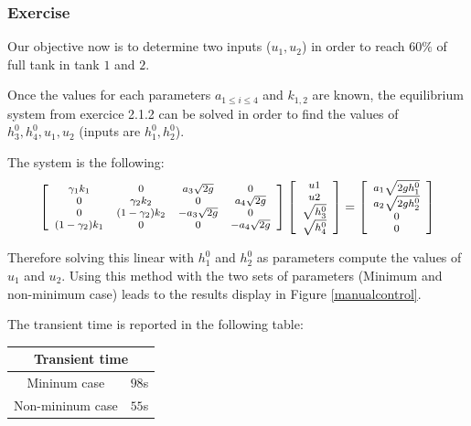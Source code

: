\subsubsection{Exercise}

Our objective now is to determine two inputs ($u_1, u_2$) in order to reach $60\%$ of full tank in tank $1$ and $2$.

Once the values for each parameters $a_{1 \leq i \leq 4}$ and $k_{1,2}$ are known, the equilibrium system from exercice 2.1.2 can be solved in order to find the values of $h_3^0,h_4^0,u_1,u_2$ (inputs are $h_1^0,h_2^0$).  

The system is the following:
$$
    \footnotesize
\left[
    \begin{array}{cccc}
        \gamma_1 k_1 & 0 & a_3 \sqrt{2g} & 0 \\
        0 & \gamma_2 k_2 & 0 & a_4 \sqrt{2g} \\
        0 & (1-\gamma_2) k_2 & -a_3 \sqrt{2g} & 0 \\
        (1-\gamma_2) k_1 & 0 & 0 & -a_4 \sqrt{2g} \\
    \end{array}
\right]
\left[
    \begin{array}{c}
        u1 \\ u2 \\ \sqrt{h_3^0} \\ \sqrt{h_4^0}
    \end{array}
\right]
=
\left[
    \begin{array}{c}
        a_1 \sqrt{2gh_1^0} \\
        a_2 \sqrt{2gh_2^0} \\
        0 \\
        0 \\
    \end{array}
\right]
$$

Therefore solving this linear with $h_1^0$ and $h_2^0$ as parameters compute the values of $u_1$ and $u_2$. 
Using this method with the two sets of parameters (Minimum and non-minimum case) leads to the results display in Figure \ref{manualcontrol}.

The transient time is reported in the following table:

\begin{center}
    \footnotesize
\begin{tabular}{|cc|}
    \hline
    \multicolumn{2}{|c|}{Transient time} \\
    \hline
    Mininum case & $98$s \\
    Non-mininum case & $55$s \\
    \hline
\end{tabular}
\end{center}

